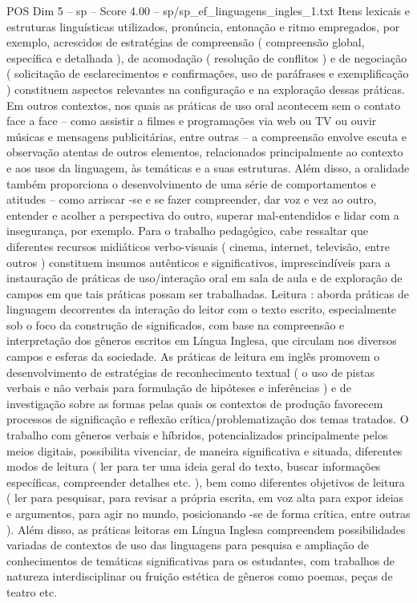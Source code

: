 \begin{textsample}{POS Dim 5 – sp – Score 4.00 – sp/sp\_ef\_linguagens\_ingles\_1.txt}
Itens lexicais e estruturas linguísticas utilizados, pronúncia, entonação e ritmo empregados, por exemplo, acrescidos de estratégias de compreensão ( compreensão global, específica e detalhada ), de acomodação ( resolução de conflitos ) e de negociação ( solicitação de esclarecimentos e confirmações, uso de paráfrases e exemplificação ) constituem aspectos relevantes na configuração e na exploração dessas práticas.
Em outros contextos, nos quais as práticas de uso oral acontecem sem o contato face a face – como assistir a filmes e programações via web ou TV ou ouvir músicas e mensagens publicitárias, entre outras – a compreensão envolve escuta e observação atentas de outros elementos, relacionados principalmente ao contexto e aos usos da linguagem, às temáticas e a suas estruturas.
Além disso, a oralidade também proporciona o desenvolvimento de uma série de comportamentos e atitudes – como arriscar -se e se fazer compreender, dar voz e vez ao outro, entender e acolher a perspectiva do outro, superar mal-entendidos e lidar com a insegurança, por exemplo.
Para o trabalho pedagógico, cabe ressaltar que diferentes recursos midiáticos verbo-visuais ( cinema, internet, televisão, entre outros ) constituem insumos autênticos e significativos, imprescindíveis para a instauração de práticas de uso/interação oral em sala de aula e de exploração de campos em que tais práticas possam ser trabalhadas.
Leitura : aborda práticas de linguagem decorrentes da interação do leitor com o texto escrito, especialmente sob o foco da construção de significados, com base na compreensão e interpretação dos gêneros escritos em Língua Inglesa, que circulam nos diversos campos e esferas da sociedade.
As práticas de leitura em inglês promovem o desenvolvimento de estratégias de reconhecimento textual ( o uso de pistas verbais e não verbais para formulação de hipóteses e inferências ) e de investigação sobre as formas pelas quais os contextos de produção favorecem processos de significação e reflexão crítica/problematização dos temas tratados.
O trabalho com gêneros verbais e híbridos, potencializados principalmente pelos meios digitais, possibilita vivenciar, de maneira significativa e situada, diferentes modos de leitura ( ler para ter uma ideia geral do texto, buscar informações específicas, compreender detalhes etc. ), bem como diferentes objetivos de leitura ( ler para pesquisar, para revisar a própria escrita, em voz alta para expor ideias e argumentos, para agir no mundo, posicionando -se de forma crítica, entre outras ).
Além disso, as práticas leitoras em Língua Inglesa compreendem possibilidades variadas de contextos de uso das linguagens para pesquisa e ampliação de conhecimentos de temáticas significativas para os estudantes, com trabalhos de natureza interdisciplinar ou fruição estética de gêneros como poemas, peças de teatro etc.

\end{textsample}
